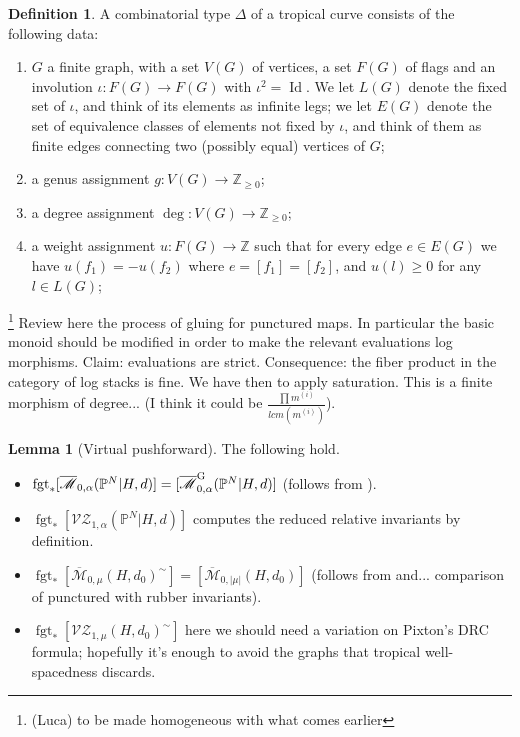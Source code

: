 \documentclass[11pt]{amsart}
\newcommand{\M}[4]{\overline{\mathcal{M}}_{#1,#2}(#3,#4)}
\newcommand{\MG}[4]{\overline{\mathcal{M}}^{\rm G}_{#1,#2}(#3,#4)}
\newcommand{\PP}{\mathbb P}
\newcommand{\Z}{\mathbb{Z}}
\newcommand{\VZc}[4]{\mathcal{V\!Z}_{#1,#2}(#3,#4)}
\renewcommand{\to}{\rightarrow}
\newcommand{\Id}{\operatorname{Id}}
\newcommand{\fgt}{\operatorname{fgt}}
\theoremstyle{definition}
\newtheorem{lemma}[thm]{Lemma}
\theoremstyle{definition}
\newtheorem{definition}[thm]{Definition}
\begin{document}
\newpage

\begin{definition} A combinatorial type $\Delta$ of a tropical curve consists of the following data:
\begin{enumerate}
\item $G$ a finite graph, with a set $V(G)$ of vertices, a set $F(G)$ of flags and an involution $\iota \colon F(G) \to F(G)$ with $\iota^2=\Id$. We let $L(G)$ denote the fixed set of $\iota$, and think of its elements as infinite legs; we let $E(G)$ denote the set of equivalence classes of elements not fixed by $\iota$, and think of them as finite edges connecting two (possibly equal) vertices of $G$;
\item a genus assignment $g \colon V(G) \to \Z_{\geq 0}$;
\item a degree assignment $\deg \colon V(G) \to \Z_{\geq 0}$;
\item a weight assignment $u \colon F(G)  \to \Z$ such that for every edge $e \in E(G)$ we have $u(f_1)=-u(f_2)$ where $e=[f_1]=[f_2]$, and $u(l) \geq 0$ for any $l \in L(G)$;
\end{enumerate}
\end{definition}


\footnote{(Luca) to be made homogeneous with what comes earlier} Review here the process of gluing for punctured maps. In particular the basic monoid should be modified in order to make the relevant evaluations log morphisms. Claim: evaluations are strict. Consequence: the fiber product in the category of log stacks is fine. We have then to apply saturation. This is a finite morphism of degree... (I think it could be $\frac{\prod m^{(i)}}{lcm(m^{(i)})}$).




\begin{lemma}[Virtual pushforward] The following hold.
 \begin{itemize}
  \item $\fgt_*[\M{0}{\alpha}{\PP^N|H}{d}]=[\MG{0}{\alpha}{\PP^N|H}{d}]$ (follows from \cite{GathmannThesis,AbramovichMarcusWiseComparison}).
  \item $\fgt_*[\VZc{1}{\alpha}{\PP^N|H}{d}]$ computes the reduced relative invariants by definition.
  \item $\fgt_*[\M{0}{\mu}{H}{d_0}^\sim]=[\M{0}{\lvert\mu\rvert}{H}{d_0}]$ (follows from \cite{GathmannThesis} and... comparison of punctured with rubber invariants).
  \item $\fgt_*[\VZc{1}{\mu}{H}{d_0}^\sim]$ here we should need a variation on Pixton's DRC formula; hopefully it's enough to avoid the graphs that tropical well-spacedness discards.
 \end{itemize}
\end{lemma}
\end{document}
